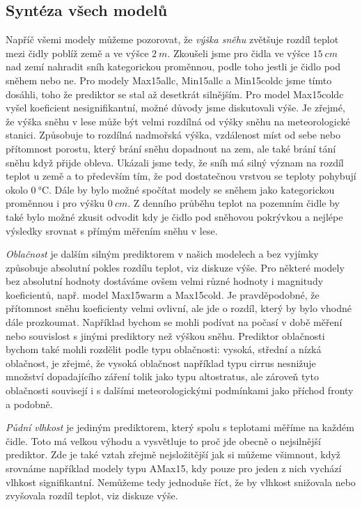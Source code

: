 \subsection{Syntéza všech modelů}
Napříč všemi modely můžeme pozorovat, že \textit{výška sněhu} zvětšuje rozdíl teplot mezi čidly poblíž země a ve výšce $\SI{2}{m}$. Zkoušeli jsme pro čidla ve výšce $\SI{15}{cm}$ nad zemí nahradit sníh kategorickou proměnnou, podle toho jestli je čidlo pod sněhem nebo ne. Pro modely Max15allc, Min15allc a Min15coldc jsme tímto dosáhli, toho že prediktor se stal až desetkrát silnějším. Pro model Max15coldc vyšel koeficient nesignifikantní, možné důvody jsme diskutovali výše. Je zřejmé, že výška sněhu v lese může být velmi rozdílná od výšky sněhu na meteorologické stanici. Způsobuje to rozdílná nadmořská výška, vzdálenost míst od sebe nebo přítomnost porostu, který brání sněhu dopadnout na zem, ale také brání tání sněhu když přijde obleva. Ukázali jsme tedy, že sníh má silný význam na rozdíl teplot u země a to především tím, že pod dostatečnou vrstvou se teploty pohybují okolo $\SI{0}{\celsius}$. Dále by bylo možné spočítat modely se sněhem jako kategorickou proměnnou i pro výšku $\SI{0}{cm}$. Z denního průběhu teplot na pozemním čidle by také bylo možné zkusit odvodit kdy je čidlo pod sněhovou pokrývkou a nejlépe výsledky srovnat s přímým měřením sněhu v lese.

\textit{Oblačnost} je dalším silným prediktorem v našich modelech a bez vyjímky způsobuje absolutní pokles rozdílu teplot, viz diskuze výše. Pro některé modely bez absolutní hodnoty dostáváme ovšem velmi různé hodnoty i magnitudy koeficientů, např. model Max15warm a Max15cold. Je pravděpodobné, že přítomnost sněhu koeficienty velmi ovlivní, ale jde o rozdíl, který by bylo vhodné dále prozkoumat. Například bychom se mohli podívat na počasí v době měření nebo souvislost s jinými prediktory než výškou sněhu. Prediktor oblačnosti bychom také mohli rozdělit podle typu oblačnosti: vysoká, střední a nízká oblačnost, je zřejmé, že vysoká oblačnost například typu cirrus nesnižuje množství dopadajícího záření tolik jako typu altostratus, ale zároveň tyto oblačnosti souvisejí i s dalšími meteorologickými podmínkami jako příchod fronty a podobně.

\textit{Půdní vlhkost} je jediným prediktorem, který spolu s teplotami měříme na každém čidle. Toto má velkou výhodu a vysvětluje to proč jde obecně o nejsilnější prediktor. Zde je také vztah zřejmě nejsložitější jak si můžeme všimnout, když srovnáme například modely typu AMax15, kdy pouze pro jeden z nich vychází vlhkost signifikantní. Nemůžeme tedy jednoduše říct, že by vlhkost snižovala nebo zvyšovala rozdíl teplot, viz diskuze výše.

